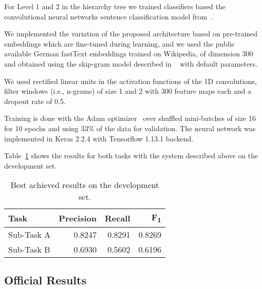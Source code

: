 \documentclass[11pt,a4paper]{article}
\begin{document}
For Level 1 and 2 in the hierarchy tree we trained classifiers based the convolutional
neural networks sentence classification model from~\citet{kim-2014-convolutional}.

We implemented the variation of the proposed architecture based on pre-trained embeddings
which are fine-tuned during learning, and we used the public available German fastText embeddings trained on Wikipedia, of dimension 300 and obtained using the skip-gram model described in ~\citet{bojanowski-etal-2017-enriching} with default parameters.

We used rectified linear units in the activation functions of the 1D convolutions,
filter windows (i.e., n-grams) of size 1 and 2 with 300 feature maps each and a
dropout rate of 0.5.

Training is done with the Adam optimizer~\cite{journals/corr/KingmaB14} over
shuffled mini-batches of size 16 for 10 epochs and using 33\% of the data for validation.
The neural network was implemented in Keras 2.2.4 with Tensorflow 1.13.1 backend.


\begin{comment}

\end{comment}


Table~\ref{devset-results} shows the results for both tasks with the system described
above on the development set.

\begin{table}
\begin{center}
\begin{tabular}{|l|r|r|r|}
\hline\centering\textbf{Task}  & \textbf{Precision} &  \textbf{Recall} &  \textbf{F\textsubscript{1}}\\
\hline
 Sub-Task A   & 0.8247 & 0.8291 & 0.8269 \\
 Sub-Task B   & 0.6930 & 0.5602 & 0.6196 \\
\hline
\end{tabular}
\end{center}
\caption{\label{devset-results} Best achieved results on the development set.}
\end{table}









\subsection{Official Results}
\end{document}
